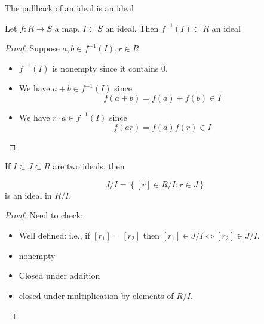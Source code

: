 \documentclass{beamer}
\begin{document}
\begin{frame}{The pullback of an ideal is an ideal}


\begin{lemma}
Let $f:R\to S$ a map, $I\subset S$ an ideal.  Then $f^{-1}(I)\subset R$ an ideal
\end{lemma}


\begin{proof}
Suppose $a,b\in f^{-1}(I), r\in R$
\begin{itemize}
\item $f^{-1}(I)$ is nonempty since it contains 0.
\item We have $a+b\in f^{-1}(I)$ since
$$f(a+b)=f(a)+f(b)\in I$$
\item We have $r\cdot a\in f^{-1}(I)$ since
$$f(ar)=f(a)f(r)\in I$$
\end{itemize}
\end{proof}


\end{frame}

\begin{frame}
\begin{lemma} If $I\subset J\subset R$ are two ideals, then 

$$J/I=\left\{[r]\in R/I : r\in J\right\}$$
is an ideal in $R/I$.
\end{lemma}

\begin{proof}
Need to check:
\begin{itemize}
\item Well defined: i.e., if $[r_1]=[r_2]$ then $[r_1]\in J/I\iff [r_2]\in J/I$. 
\item nonempty
\item Closed under addition
\item closed under multiplication by elements of $R/I$.
\end{itemize}
\end{proof}
\end{frame}
\end{document}
